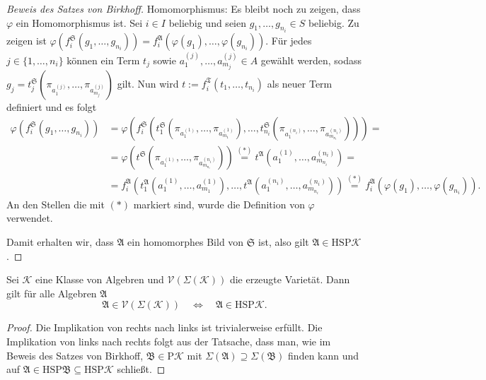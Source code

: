 \begin{proof}[Beweis des Satzes von Birkhoff]
    Homomorphismus: Es bleibt noch zu zeigen, dass $\varphi$ ein Homomorphismus ist.
    Sei $i\in I$ beliebig und seien $g_1,\ldots,g_{n_i}\in S$ beliebig. Zu zeigen ist $\varphi(f^\mathfrak{S}_i(g_1,\ldots,g_{n_i}))=f^\mathfrak{A}_i(\varphi(g_1),\ldots,\varphi(g_{n_i}))$.
    Für jedes $j\in \{1,\ldots,n_i\}$ können ein Term $t_j$ sowie $a_1^{(j)},\ldots,a_{m_j}^{(j)}\in A$ gewählt werden,
    sodass $g_j=t^\mathfrak{S}_j(\pi_{a_1^{(j)}},\ldots,\pi_{a_{m_j}^{(j)}})$ gilt. Nun wird $t:=f^\mathfrak{T}_i(t_1,\ldots,t_{n_i})$ als neuer Term definiert und es folgt
    \begin{align*}
        \varphi(f^\mathfrak{S}_i(g_1,\ldots,g_{n_i}))&=\varphi(f^\mathfrak{S}_i(t^\mathfrak{S}_1(\pi_{a_1^{(1)}},\ldots,\pi_{a_{m_1}^{(1)}}),\ldots,t^\mathfrak{S}_{n_i}(\pi_{a_1^{(n_i)}},\ldots,\pi_{a_{m_{n_i}}^{(n_i)}})))=\\
        &=\varphi(t^\mathfrak{S}(\pi_{a_1^{(1)}},\ldots,\pi_{a_{m_{n_i}}^{(n_i)}}))\stackrel{(*)}{=}t^\mathfrak{A}(a_1^{(1)},\ldots,a_{m_{n_i}}^{(n_i)})=\\
        &=f^\mathfrak{A}_i(t^\mathfrak{A}_1(a_1^{(1)},\ldots,a_{m_1}^{(1)}),\ldots,t^\mathfrak{A}(a_1^{(n_i)},\ldots,a_{m_{n_i}}^{(n_i)}))\stackrel{(*)}{=}f^\mathfrak{A}_i(\varphi(g_1),\ldots,\varphi(g_{n_i})).
    \end{align*}
    An den Stellen die mit $(*)$ markiert sind, wurde die Definition von $\varphi$ verwendet.

    Damit erhalten wir, dass $\mathfrak{A}$ ein homomorphes Bild von $\mathfrak{S}$ ist, also gilt $\mathfrak{A}\in\mathrm{HSP}\mathcal{K}$.
\end{proof}

\begin{corollary}
    Sei $\mathcal{K}$ eine Klasse von Algebren und $\mathcal{V}(\Sigma(\mathcal{K}))$ die erzeugte Varietät. Dann gilt für alle Algebren $\mathfrak{A}$
    $$ \mathfrak{A} \in \mathcal{V}(\Sigma(\mathcal{K})) \quad \Leftrightarrow \quad \mathfrak{A} \in \mathrm{HSP}\mathcal{K}. $$
\end{corollary}

\begin{proof}
    Die Implikation von rechts nach links ist trivialerweise erfüllt. Die Implikation von links nach rechts folgt aus der Tatsache, dass man, wie im Beweis des Satzes von Birkhoff, $\mathfrak{B}\in \mathrm{P}\mathcal{K}$ mit $\Sigma(\mathfrak{A})\supseteq\Sigma(\mathfrak{B})$ finden kann und auf $\mathfrak{A}\in \mathrm{HSP}\mathfrak{B}\subseteq \mathrm{HSP}\mathcal{K}$ schließt.
\end{proof}